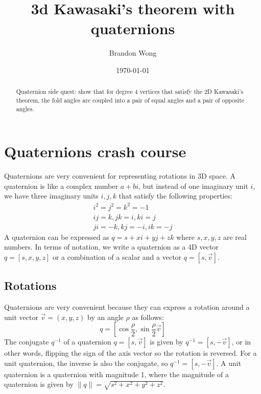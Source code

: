 \documentclass[11pt]{article}
\title{3d Kawasaki's theorem with quaternions}
\author{Brandon Wong}
\date{\today}
\begin{document}
\maketitle

\begin{abstract}
    Quaternion side quest: show that for degree 4 vertices that satisfy the 2D Kawasaki's theorem, the fold angles are coupled into a pair of equal angles and a pair of opposite angles.

\end{abstract}

\section{Quaternions crash course}

Quaternions are very convenient for representing rotations in 3D space. A quaternion is like a complex number $a+b i$, but instead of one imaginary unit $i$, we have three imaginary units $i, j, k$ that satisfy the following properties:
\begin{align*}
    i^2 = j^2 = k^2 = -1 \\
    ij = k, jk = i, ki = j \\
    ji = -k, kj = -i, ik = -j
\end{align*}
A quaternion can be expressed as $q = s + x i + y j + z k$ where $s,x,y,z$ are real numbers. In terms of notation, we write a quaternion as a 4D vector $q = [s, x, y, z]$ or a combination of a scalar and a vector $q = [s, \vec{v}]$.

\subsection{Rotations}
Quaternions are very convenient because they can express a rotation around a unit vector $\vec{v} = (x,y,z)$ by an angle $\rho$ as follows:
\begin{equation}\label{eq:quaternion_rotation}
q= \left[ \cos\frac{\rho}{2}, \sin\frac{\rho}{2}\vec{v}\right]
\end{equation}
The conjugate $q^{-1}$ of a quaternion $q = [s, \vec{v}]$ is given by $q^{-1} = [s, -\vec{v}]$, or in other words, flipping the sign of the axis vector so the rotation is reversed. For a unit quaternion, the inverse is also the conjugate, so $q^{-1} = [s, -\vec{v}]$. A unit quaternion is a quaternion with magnitude 1, where the magnitude of a quaternion is given by $\lVert q \rVert = \sqrt{s^2 + x^2 + y^2 + z^2}$. 
\end{document}
